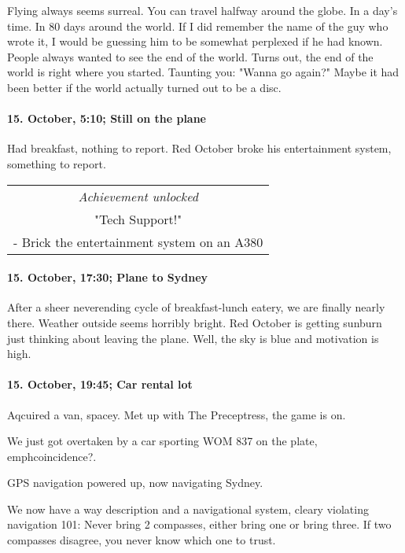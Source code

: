 Flying always seems surreal.
You can travel halfway around the globe.
In a day's time.
In 80 days around the world.
If I did remember the name of the guy who wrote it, I would be guessing him to be somewhat perplexed if he had known.
People always wanted to see the end of the world.
Turns out, the end of the world is right where you started.
Taunting you: "Wanna go again?"
Maybe it had been better if the world actually turned out to be a disc.

\paragraph{15. October, 5:10; Still on the plane}
Had breakfast, nothing to report.
Red October broke his entertainment system, something to report.

\begin{center}
\begin{tabular}{||c||}
\emph{Achievement unlocked}\\
"Tech Support!"\\
\multicolumn{1}{||p{0.8\textwidth}||}{\footnotesize - Brick the entertainment system on an A380} \\
\end{tabular}
\end{center}

\paragraph{15. October, 17:30; Plane to Sydney}
After a sheer neverending cycle of breakfast-lunch eatery, we are finally nearly there.
Weather outside seems horribly bright.
Red October is getting sunburn just thinking about leaving the plane.
Well, the sky is blue and motivation is high.

\paragraph{15. October, 19:45; Car rental lot}
Aqcuired a van, spacey.
Met up with The Preceptress, the game is on.

We just got overtaken by a car sporting WOM 837 on the plate, emph{coincidence}?.

GPS navigation powered up, now navigating Sydney.

We now have a way description and a navigational system, cleary violating navigation 101: Never bring 2 compasses, either bring one or bring three.
If two compasses disagree, you never know which one to trust.

